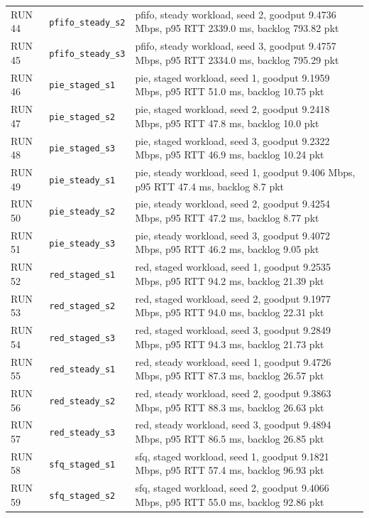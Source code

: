 \documentclass[11pt,a4paper]{article}
\begin{document}
\begin{longtable}{p{1.5cm}p{5.0cm}p{9.5cm}}
RUN 44 & \texttt{pfifo\_steady\_s2} & pfifo, steady workload, seed 2, goodput 9.4736 Mbps, p95 RTT 2339.0 ms, backlog 793.82 pkt \\
RUN 45 & \texttt{pfifo\_steady\_s3} & pfifo, steady workload, seed 3, goodput 9.4757 Mbps, p95 RTT 2334.0 ms, backlog 795.29 pkt \\
RUN 46 & \texttt{pie\_staged\_s1} & pie, staged workload, seed 1, goodput 9.1959 Mbps, p95 RTT 51.0 ms, backlog 10.75 pkt \\
RUN 47 & \texttt{pie\_staged\_s2} & pie, staged workload, seed 2, goodput 9.2418 Mbps, p95 RTT 47.8 ms, backlog 10.0 pkt \\
RUN 48 & \texttt{pie\_staged\_s3} & pie, staged workload, seed 3, goodput 9.2322 Mbps, p95 RTT 46.9 ms, backlog 10.24 pkt \\
RUN 49 & \texttt{pie\_steady\_s1} & pie, steady workload, seed 1, goodput 9.406 Mbps, p95 RTT 47.4 ms, backlog 8.7 pkt \\
RUN 50 & \texttt{pie\_steady\_s2} & pie, steady workload, seed 2, goodput 9.4254 Mbps, p95 RTT 47.2 ms, backlog 8.77 pkt \\
RUN 51 & \texttt{pie\_steady\_s3} & pie, steady workload, seed 3, goodput 9.4072 Mbps, p95 RTT 46.2 ms, backlog 9.05 pkt \\
RUN 52 & \texttt{red\_staged\_s1} & red, staged workload, seed 1, goodput 9.2535 Mbps, p95 RTT 94.2 ms, backlog 21.39 pkt \\
RUN 53 & \texttt{red\_staged\_s2} & red, staged workload, seed 2, goodput 9.1977 Mbps, p95 RTT 94.0 ms, backlog 22.31 pkt \\
RUN 54 & \texttt{red\_staged\_s3} & red, staged workload, seed 3, goodput 9.2849 Mbps, p95 RTT 94.3 ms, backlog 21.73 pkt \\
RUN 55 & \texttt{red\_steady\_s1} & red, steady workload, seed 1, goodput 9.4726 Mbps, p95 RTT 87.3 ms, backlog 26.57 pkt \\
RUN 56 & \texttt{red\_steady\_s2} & red, steady workload, seed 2, goodput 9.3863 Mbps, p95 RTT 88.3 ms, backlog 26.63 pkt \\
RUN 57 & \texttt{red\_steady\_s3} & red, steady workload, seed 3, goodput 9.4894 Mbps, p95 RTT 86.5 ms, backlog 26.85 pkt \\
RUN 58 & \texttt{sfq\_staged\_s1} & sfq, staged workload, seed 1, goodput 9.1821 Mbps, p95 RTT 57.4 ms, backlog 96.93 pkt \\
RUN 59 & \texttt{sfq\_staged\_s2} & sfq, staged workload, seed 2, goodput 9.4066 Mbps, p95 RTT 55.0 ms, backlog 92.86 pkt \\

\end{longtable}
\end{document}
